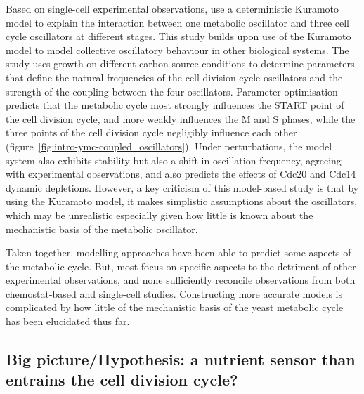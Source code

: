 Based on single-cell experimental observations, \textcite{ozsezenInferenceHighLevelInteraction2019} use a deterministic Kuramoto model to explain the interaction between one metabolic oscillator and three cell cycle oscillators at different stages.
This study builds upon use of the Kuramoto model to model collective oscillatory behaviour in other biological systems.
The study uses growth on different carbon source conditions to determine parameters that define the natural frequencies of the cell division cycle oscillators and the strength of the coupling between the four oscillators.
Parameter optimisation predicts that the metabolic cycle most strongly influences the START point of the cell division cycle, and more weakly influences the M and S phases, while the three points of the cell division cycle negligibly influence each other (figure~\ref{fig:intro-ymc-coupled_oscillators}).
Under perturbations, the model system also exhibits stability but also a shift in oscillation frequency, agreeing with experimental observations, and also predicts the effects of Cdc20 and Cdc14 dynamic depletions.
However, a key criticism of this model-based study is that by using the Kuramoto model, it makes simplistic assumptions about the oscillators, which may be unrealistic especially given how little is known about the mechanistic basis of the metabolic oscillator.


Taken together, modelling approaches have been able to predict some aspects of the metabolic cycle.
But, most focus on specific aspects to the detriment of other experimental observations, and none sufficiently reconcile observations from both chemostat-based and single-cell studies.
Constructing more accurate models is complicated by how little of the mechanistic basis of the yeast metabolic cycle has been elucidated thus far.

\subsection{Big picture/Hypothesis: a nutrient sensor than entrains the cell division cycle?}
\label{subsec:intro-ymc-hypothesis}

